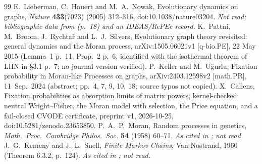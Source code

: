 \documentclass[11pt]{article}
\begin{document}
\begin{thebibliography}{99}\small
{} E.~Lieberman, C.~Hauert and M.~A.~Nowak, Evolutionary dynamics on graphs, \emph{Nature} \textbf{433}(7023) (2005) 312--316, doi:10.1038/nature03204. \emph{Not read; bibliographic data from \cite{KU} (p.~18) and an IDEAS/RePEc record.}
 K.~Pattni, M.~Broom, J.~Rychta\v{r} and L.~J.~Silvers, Evolutionary graph theory revisited: general dynamics and the Moran process, arXiv:1505.06021v1 [q-bio.PE], 22 May 2015 (Lemma~1 p.~11, Prop.~2 p.~6, identified with the isothermal theorem of LHN in \S3.1 p.~7; no journal version verified).
 P.~Keller and M.~U\u{g}urlu, Fixation probability in Moran-like Processes on graphs, arXiv:2403.12598v2 [math.PR], 11~Sep.\ 2024 (abstract; pp.\ 4, 7, 9, 10, 18; source typos not copied).
 X.~Callens, Fixation probabilities as absorption limits of matrix powers, kernel-checked: neutral Wright--Fisher, the Moran model with selection, the Price equation, and a fail-closed CVODE certificate, preprint v1, 2026-10-25, doi:10.5281/zenodo.23653850.
 P.~A.~P.~Moran, Random processes in genetics, \emph{Math.\ Proc.\ Cambridge Philos.\ Soc.} \textbf{54} (1958) 60--71. \emph{As cited in \cite{KU}; not read.}
 J.~G.~Kemeny and J.~L.~Snell, \emph{Finite Markov Chains}, Van Nostrand, 1960 (Theorem 6.3.2, p.~124). \emph{As cited in \cite{PBRS}; not read.}
\end{thebibliography}
\end{document}
